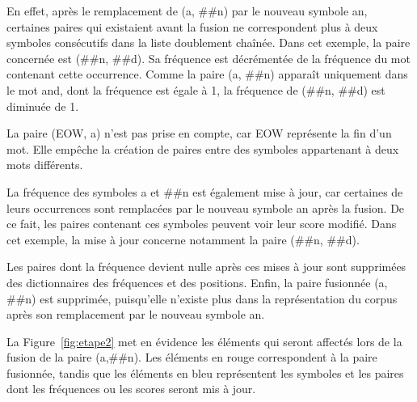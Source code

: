 \documentclass[12pt,a4paper]{report}
\begin{document}
	En effet, après le remplacement de (a, \#\#n) par le nouveau symbole an, certaines paires qui existaient avant la fusion ne correspondent plus à deux symboles consécutifs dans la liste doublement chaînée. Dans cet exemple, la paire concernée est (\#\#n, \#\#d). Sa fréquence est décrémentée de la fréquence du mot contenant cette occurrence. Comme la paire (a, \#\#n) apparaît uniquement dans le mot and, dont la fréquence est égale à 1, la fréquence de (\#\#n, \#\#d) est diminuée de 1.
	
	La paire (EOW, a) n'est pas prise en compte, car EOW représente la fin d'un mot. Elle empêche la création de paires entre des symboles appartenant à deux mots différents.
	
	La fréquence des symboles a et \#\#n est également mise à jour, car certaines de leurs occurrences sont remplacées par le nouveau symbole an après la fusion. De ce fait, les paires contenant ces symboles peuvent voir leur score modifié. Dans cet exemple, la mise à jour concerne notamment la paire (\#\#n, \#\#d).
	
	Les paires dont la fréquence devient nulle après ces mises à jour sont supprimées des dictionnaires des fréquences et des positions. Enfin, la paire fusionnée (a, \#\#n) est supprimée, puisqu'elle n'existe plus dans la représentation du corpus après son remplacement par le nouveau symbole an.
	
	La Figure~\ref{fig:etape2} met en évidence les éléments qui seront affectés lors de la fusion de la paire (a,\#\#n). Les éléments en rouge correspondent à la paire fusionnée, tandis que les éléments en bleu représentent les symboles et les paires dont les fréquences ou les scores seront mis à jour.
	
\end{document}
